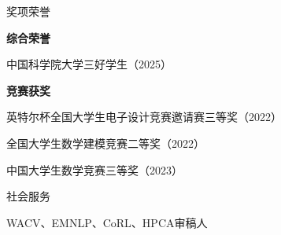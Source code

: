 \documentclass{resume}
\begin{document}

\begin{rSection}{奖项荣誉}

\textbf{综合荣誉}

中国科学院大学三好学生（2025）

\vspace{3pt}

\textbf{竞赛获奖}

英特尔杯全国大学生电子设计竞赛邀请赛三等奖（2022）

全国大学生数学建模竞赛二等奖（2022）

中国大学生数学竞赛三等奖（2023）

\end{rSection}


\begin{rSection}{社会服务}

WACV、EMNLP、CoRL、HPCA审稿人

\end{rSection}
\end{document}
